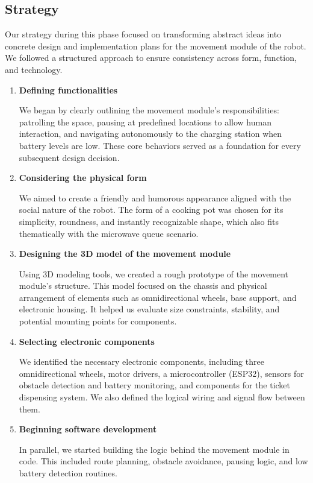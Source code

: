 \subsection{Strategy}

Our strategy during this phase focused on transforming abstract ideas into concrete design and implementation plans for the movement module of the robot. We followed a structured approach to ensure consistency across form, function, and technology.

\begin{enumerate}
    \item \textbf{Defining functionalities}
    
    We began by clearly outlining the movement module's responsibilities: patrolling the space, pausing at predefined locations to allow human interaction, and navigating autonomously to the charging station when battery levels are low. These core behaviors served as a foundation for every subsequent design decision.

    \item \textbf{Considering the physical form}
    
    We aimed to create a friendly and humorous appearance aligned with the social nature of the robot. The form of a cooking pot was chosen for its simplicity, roundness, and instantly recognizable shape, which also fits thematically with the microwave queue scenario.

    \item \textbf{Designing the 3D model of the movement module}
    
    Using 3D modeling tools, we created a rough prototype of the movement module's structure. This model focused on the chassis and physical arrangement of elements such as omnidirectional wheels, base support, and electronic housing. It helped us evaluate size constraints, stability, and potential mounting points for components.

    \item \textbf{Selecting electronic components}
    
    We identified the necessary electronic components, including three omnidirectional wheels, motor drivers, a microcontroller (ESP32), sensors for obstacle detection and battery monitoring, and components for the ticket dispensing system. We also defined the logical wiring and signal flow between them.

    \item \textbf{Beginning software development}
    
    In parallel, we started building the logic behind the movement module in code. This included route planning, obstacle avoidance, pausing logic, and low battery detection routines.
\end{enumerate}
